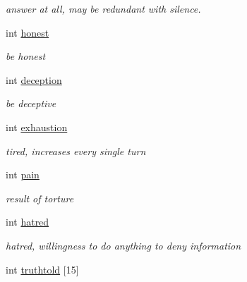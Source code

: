 \begin{DoxyCompactItemize}
\begin{DoxyCompactList}\small\item\em answer at all, may be redundant with silence. \end{DoxyCompactList}\item 
\hypertarget{struct_suspect__s_a20774be3bfbe97a7ff6de44ebf7c324d}{int \hyperlink{struct_suspect__s_a20774be3bfbe97a7ff6de44ebf7c324d}{honest}}\label{struct_suspect__s_a20774be3bfbe97a7ff6de44ebf7c324d}

\begin{DoxyCompactList}\small\item\em be honest \end{DoxyCompactList}\item 
\hypertarget{struct_suspect__s_a7480c1e6ea9e13fc672be23178e7802b}{int \hyperlink{struct_suspect__s_a7480c1e6ea9e13fc672be23178e7802b}{deception}}\label{struct_suspect__s_a7480c1e6ea9e13fc672be23178e7802b}

\begin{DoxyCompactList}\small\item\em be deceptive \end{DoxyCompactList}\item 
\hypertarget{struct_suspect__s_a138b9d4dc4a3dc4f897ea2986fdc337a}{int \hyperlink{struct_suspect__s_a138b9d4dc4a3dc4f897ea2986fdc337a}{exhaustion}}\label{struct_suspect__s_a138b9d4dc4a3dc4f897ea2986fdc337a}

\begin{DoxyCompactList}\small\item\em tired, increases every single turn \end{DoxyCompactList}\item 
\hypertarget{struct_suspect__s_a7b6fc79ab716033592c1f3b0e8797e57}{int \hyperlink{struct_suspect__s_a7b6fc79ab716033592c1f3b0e8797e57}{pain}}\label{struct_suspect__s_a7b6fc79ab716033592c1f3b0e8797e57}

\begin{DoxyCompactList}\small\item\em result of torture \end{DoxyCompactList}\item 
\hypertarget{struct_suspect__s_aaf6a1c91ce381e01b2bee299bec337dc}{int \hyperlink{struct_suspect__s_aaf6a1c91ce381e01b2bee299bec337dc}{hatred}}\label{struct_suspect__s_aaf6a1c91ce381e01b2bee299bec337dc}

\begin{DoxyCompactList}\small\item\em hatred, willingness to do anything to deny information \end{DoxyCompactList}\item 
\hypertarget{struct_suspect__s_af2beebc000e0420ebb06ddf40a6a08ca}{int \hyperlink{struct_suspect__s_af2beebc000e0420ebb06ddf40a6a08ca}{truthtold} \mbox{[}15\mbox{]}}\label{struct_suspect__s_af2beebc000e0420ebb06ddf40a6a08ca}


\end{DoxyCompactItemize}
